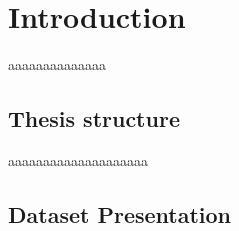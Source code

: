 \chapter{Introduction}
\label{chpr:intro}

\bigskip

aaaaaaaaaaaaaa
\section{Thesis structure}
\bigskip
aaaaaaaaaaaaaaaaaaaa


\section{Dataset  Presentation}
\bigskip

